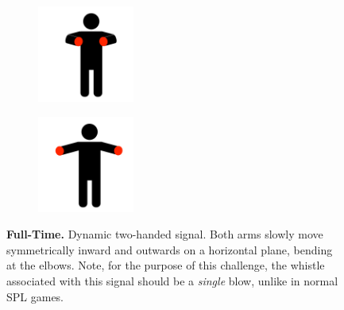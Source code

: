 \begin{figure}[ht!]
    \centering
    \begin{subfigure}{.33\textwidth}
        \centering
        \includegraphics[height=120px]{figs/technical_challenges/full-time-start.png}
    \end{subfigure}
    \begin{subfigure}{.33\textwidth}
        \centering
        \includegraphics[height=120px]{figs/technical_challenges/full-time-end.png}
    \end{subfigure}
    \caption{\textbf{Full-Time.} Dynamic two-handed signal. Both arms slowly move symmetrically inward and outwards on a horizontal plane, bending at the elbows. Note, for the purpose of this challenge, the whistle associated with this signal should be a \textit{single} blow, unlike in normal SPL games.}
\end{figure}

